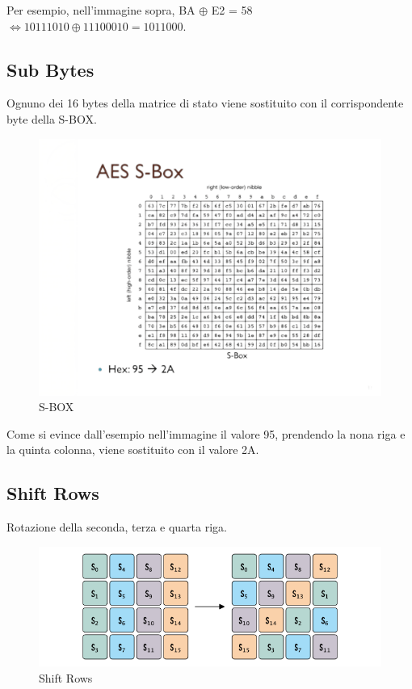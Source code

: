 
\textsf{\small Per esempio, nell'immagine sopra, BA $ \oplus $ E2 = 58 $ \Leftrightarrow 10111010 \oplus 11100010 = 1011000 $.}

\subsection{Sub Bytes}


\textsf{\small Ognuno dei 16 bytes della matrice di stato viene sostituito con il corrispondente byte della S-BOX.}

\begin{figure}[H]
	\centering
	\includegraphics[width=.9\textwidth, height=.9\textheight, keepaspectratio]{./images/aes/aes-s-box-no-background.png}
	\caption{S-BOX}
	\label{fig:sbox}
\end{figure}

\textsf{\small Come si evince dall'esempio nell'immagine il valore 95, prendendo la nona riga e la quinta colonna, viene sostituito con il valore 2A.}

\subsection{Shift Rows}


\textsf{\small Rotazione della seconda, terza e quarta riga.}

\begin{figure}[H]
	\centering
	\includegraphics[width=.9\textwidth, height=.9\textheight, keepaspectratio]{./images/aes/aes-shift-rows.png}
	\caption{Shift Rows}
	\label{fig:shift_rows2}
\end{figure}


